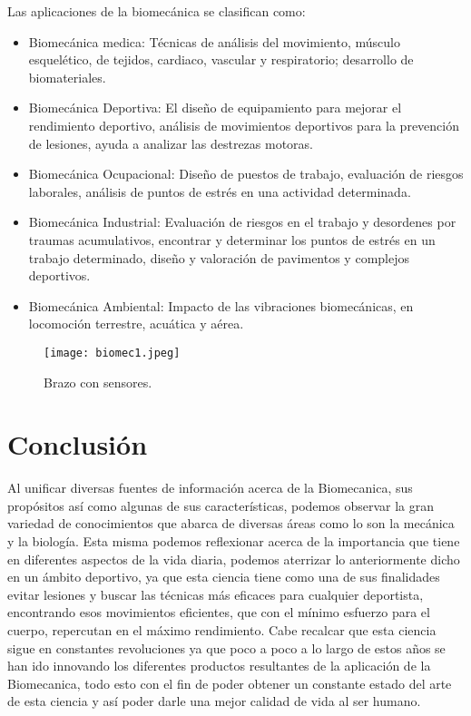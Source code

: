 \documentclass[a4paper]{article}
\begin{document}
Las aplicaciones de la biomecánica se clasifican como:
\begin{itemize}
    \item Biomecánica medica: Técnicas de análisis del movimiento, músculo esquelético, de tejidos, cardiaco, vascular y respiratorio; desarrollo de biomateriales.
\end{itemize}
\begin{itemize}
    \item Biomecánica Deportiva: El diseño de equipamiento para mejorar el rendimiento deportivo, análisis de movimientos deportivos para la prevención de lesiones, ayuda a analizar las destrezas motoras.
\end{itemize}
\begin{itemize}
    \item Biomecánica Ocupacional: Diseño de puestos de trabajo, evaluación de riesgos laborales, análisis de puntos de estrés en una actividad determinada.
\end{itemize}
\begin{itemize}
    \item Biomecánica Industrial: Evaluación de riesgos en el trabajo y desordenes por traumas acumulativos, encontrar y determinar los puntos de estrés en un trabajo determinado, diseño y valoración de pavimentos y complejos deportivos.
\end{itemize}
\begin{itemize}
    \item Biomecánica Ambiental: Impacto de las vibraciones biomecánicas, en locomoción terrestre, acuática y aérea.
\end{itemize}

\begin{figure}
\centering
\texttt{[image: biomec1.jpeg]}
\caption{\label{fig:biomec1}Brazo con sensores.}
\end{figure}

\cite{ff2}

\section{Conclusi\'on}
Al unificar diversas fuentes de información acerca de la Biomecanica, sus propósitos así como algunas de sus características, podemos observar la gran variedad de conocimientos que abarca de diversas áreas como lo son la mecánica y la biología.
Esta misma podemos reflexionar acerca de la importancia que tiene en diferentes aspectos de la vida diaria, podemos aterrizar lo anteriormente dicho en un ámbito deportivo,  ya que esta ciencia tiene como una de sus finalidades  evitar lesiones y buscar las técnicas más eficaces para cualquier deportista, encontrando esos movimientos eficientes, que con el mínimo esfuerzo para el cuerpo, repercutan en el máximo rendimiento.
Cabe recalcar que esta ciencia sigue en constantes revoluciones ya que poco a poco a lo largo de estos años se han ido innovando los diferentes productos resultantes de la aplicación de la Biomecanica, todo esto con el fin de poder obtener un constante estado del arte de esta ciencia y así poder darle una mejor calidad de vida al ser humano.



\end{document}
